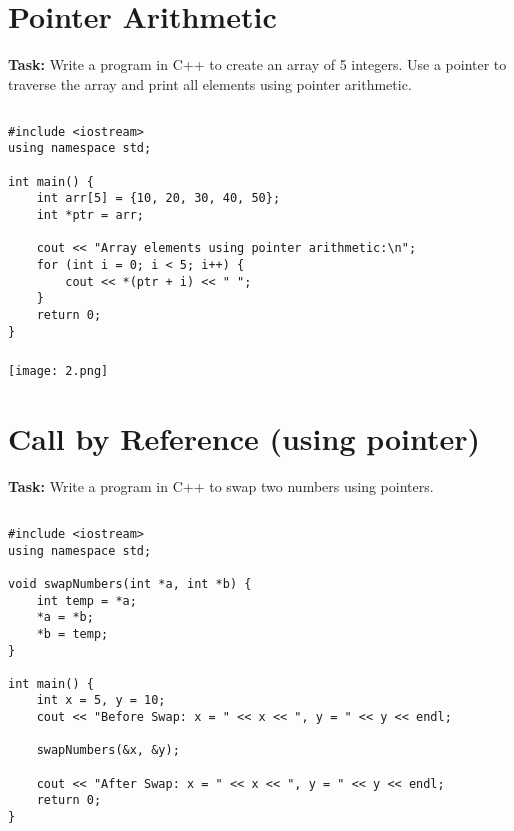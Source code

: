 \documentclass[12pt,a4paper]{article}
\begin{document}
\section{Pointer Arithmetic}
\textbf{Task:} Write a program in C++ to create an array of 5 integers. Use a pointer to traverse the array and print all elements using pointer arithmetic. 
\subsection{}
\begin{lstlisting}
#include <iostream>
using namespace std;

int main() {
    int arr[5] = {10, 20, 30, 40, 50};
    int *ptr = arr;

    cout << "Array elements using pointer arithmetic:\n";
    for (int i = 0; i < 5; i++) {
        cout << *(ptr + i) << " ";
    }
    return 0;
}

\end{lstlisting}

\subsubsection{}
\begin{center}
    \texttt{[image: 2.png]}
\end{center}


\section{Call by Reference (using pointer)}
\textbf{Task:} Write a program in C++ to swap two numbers using pointers. 

\subsection{}
\begin{lstlisting}
#include <iostream>
using namespace std;

void swapNumbers(int *a, int *b) {
    int temp = *a;
    *a = *b;
    *b = temp;
}

int main() {
    int x = 5, y = 10;
    cout << "Before Swap: x = " << x << ", y = " << y << endl;

    swapNumbers(&x, &y);

    cout << "After Swap: x = " << x << ", y = " << y << endl;
    return 0;
}
\end{lstlisting}
\end{document}
